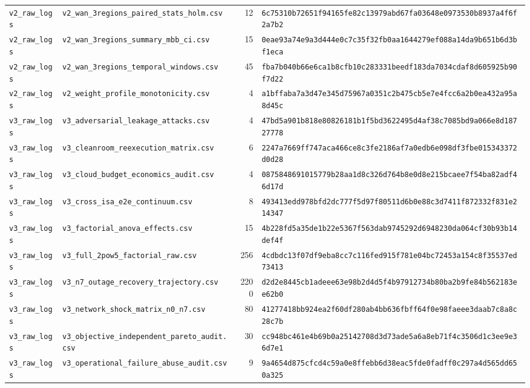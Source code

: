 \documentclass[10pt,journal,compsoc]{IEEEtran}
\begin{document}
\begin{table}[!htbp]
\begin{tabular}{@{}llrl@{}}
\texttt{v2\_raw\_logs} & \texttt{v2\_wan\_3regions\_paired\_stats\_holm.csv} & 12 & \texttt{6c75310b72651f94165fe82c13979abd67fa03648e0973530b8937a4f6f2a7b2} \\
\texttt{v2\_raw\_logs} & \texttt{v2\_wan\_3regions\_summary\_mbb\_ci.csv} & 15 & \texttt{0eae93a74e9a3d444e0c7c35f32fb0aa1644279ef088a14da9b651b6d3bf1eca} \\
\texttt{v2\_raw\_logs} & \texttt{v2\_wan\_3regions\_temporal\_windows.csv} & 45 & \texttt{fba7b040b66e6ca1b8cfb10c283331beedf183da7034cdaf8d605925b90f7d22} \\
\texttt{v2\_raw\_logs} & \texttt{v2\_weight\_profile\_monotonicity.csv} & 4 & \texttt{a1bffaba7a3d47e345d75967a0351c2b475cb5e7e4fcc6a2b0ea432a95a8d45c} \\
\texttt{v3\_raw\_logs} & \texttt{v3\_adversarial\_leakage\_attacks.csv} & 4 & \texttt{47bd5a901b818e80826181b1f5bd3622495d4af38c7085bd9a066e8d18727778} \\
\texttt{v3\_raw\_logs} & \texttt{v3\_cleanroom\_reexecution\_matrix.csv} & 6 & \texttt{2247a7669ff747aca466ce8c3fe2186af7a0edb6e098df3fbe015343372d0d28} \\
\texttt{v3\_raw\_logs} & \texttt{v3\_cloud\_budget\_economics\_audit.csv} & 4 & \texttt{0875848691015779b28aa1d8c326d764b8e0d8e215bcaee7f54ba82adf46d17d} \\
\texttt{v3\_raw\_logs} & \texttt{v3\_cross\_isa\_e2e\_continuum.csv} & 8 & \texttt{493413edd978bfd2dc777f5d97f80511d6b0e88c3d7411f872332f831e214347} \\
\texttt{v3\_raw\_logs} & \texttt{v3\_factorial\_anova\_effects.csv} & 15 & \texttt{4b228fd5a35de1b22e5367f563dab9745292d6948230da064cf30b93b14def4f} \\
\texttt{v3\_raw\_logs} & \texttt{v3\_full\_2pow5\_factorial\_raw.csv} & 256 & \texttt{4cdbdc13f07df9eba8cc7c116fed915f781e04bc72453a154c8f35537ed73413} \\
\texttt{v3\_raw\_logs} & \texttt{v3\_n7\_outage\_recovery\_trajectory.csv} & 2200 & \texttt{d2d2e8445cb1adeee63e98b2d4d5f4b97912734b80ba2b9fe84b562183ee62b0} \\
\texttt{v3\_raw\_logs} & \texttt{v3\_network\_shock\_matrix\_n0\_n7.csv} & 80 & \texttt{41277418bb924ea2f60df280ab4bb636fbff64f0e98faeee3daab7c8a8c28c7b} \\
\texttt{v3\_raw\_logs} & \texttt{v3\_objective\_independent\_pareto\_audit.csv} & 30 & \texttt{cc948bc461e4b69b0a25142708d3d73ade5a6a8eb71f4c3506d1c3ee9e36d7e1} \\
\texttt{v3\_raw\_logs} & \texttt{v3\_operational\_failure\_abuse\_audit.csv} & 9 & \texttt{9a4654d875cfcd4c59a0e8ffebb6d38eac5fde0fadff0c297a4d565dd650a325} \\

\end{tabular}
\end{table}
\end{document}
